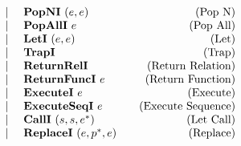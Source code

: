 \begin{align*}
\begin{array}{lcccrlr}
    &&&& | & ~ \textbf{PopNI} ~ (e, e) &\quad\text{(Pop N)} \\
    &&&& | & ~ \textbf{PopAllI} ~ e &\quad\text{(Pop All)} \\
    &&&& | & ~ \textbf{LetI} ~ (e, e) &\quad\text{(Let)} \\
    &&&& | & ~ \textbf{TrapI} &\quad\text{(Trap)} \\
    &&&& | & ~ \textbf{ReturnRelI} &\quad\text{(Return Relation)} \\
    &&&& | & ~ \textbf{ReturnFuncI} ~ e &\quad\text{(Return Function)} \\
    &&&& | & ~ \textbf{ExecuteI} ~ e &\quad\text{(Execute)} \\
    &&&& | & ~ \textbf{ExecuteSeqI} ~ e &\quad\text{(Execute Sequence)} \\
    &&&& | & ~ \textbf{CallI} ~ (s, s, e^*) &\quad\text{(Let Call)} \\
    &&&& | & ~ \textbf{ReplaceI} ~ (e, p^*, e) &\quad\text{(Replace)} \\
\end{array}
\end{align*}
\newpage
